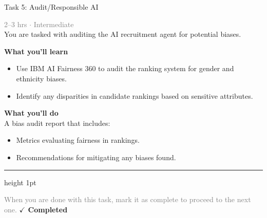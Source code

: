 \documentclass[10pt,a4paper]{article}
\begin{document}
\begin{taskbox}{Task 5: Audit/Responsible AI}

    {\small \textcolor{gray}{2--3 hrs $\cdot$ Intermediate}}\\[12pt]

     You are tasked with auditing the AI recruitment agent for potential biases.  


\vspace{8pt}
{\large \textbf{\textcolor{brandLight}{What you'll learn}}}\\[4pt]  
\begin{itemize}
    \item Use IBM AI Fairness 360 to audit the ranking system for gender and ethnicity biases.  
    \item Identify any disparities in candidate rankings based on sensitive attributes.  
\end{itemize}

\vspace{8pt}
{\large \textbf{\textcolor{brandLight}{What you'll do}}}\\[4pt]  
A bias audit report that includes:  
\begin{itemize}
    \item Metrics evaluating fairness in rankings.  
    \item Recommendations for mitigating any biases found.\par
\end{itemize}

    \vspace{16pt}

    \textcolor{cardBorder}{\hrule height 1pt}\vspace{8pt}

    \small \textcolor{gray}{When you are done with this task, mark it as complete to proceed to the next one.} \hfill \textbf{\textcolor{brandDark}{$\checkmark$ Completed}}

\end{taskbox}
\end{document}
